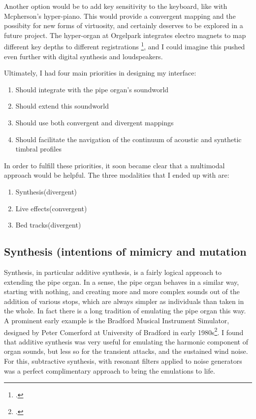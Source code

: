 \documentclass[12pt,twoside,maitrise]{dms_ks}
\theoremstyle{definition}
\begin{document}
Another option would be to add key sensitivity to the keyboard, like with Mcpherson's hyper-piano. This would provide a convergent mapping and the possibity for new forms of virtuosity, and certainly deserves to be explored in a future project. The hyper-organ at Orgelpark integrates electro magnets to map different key depths to different registrations \footcite[14]{van_heumen_new_2014}, and I could imagine this pushed even further with digital synthesis and loudspeakers. 

Ultimately, I had four main priorities in designing my interface:

\begin{enumerate}
  \item Should integrate with the pipe organ's soundworld

  \item Should extend this soundworld
   
  \item Should use both convergent and divergent mappings

  \item Should facilitate the navigation of the continuum of acoustic
and synthetic timbral profiles
\end{enumerate}

In order to fulfill these priorities, it soon became clear that a multimodal approach would be helpful. The three modalities that I ended up with are:

\begin{enumerate}
  \item Synthesis(divergent)
  
  \item Live effects(convergent)
  
  \item Bed tracks(divergent)
\end{enumerate}

\subsection{Synthesis (intentions of mimicry and mutation}

Synthesis, in particular additive synthesis, is a fairly logical approach to extending the pipe organ. 
In a sense, the pipe organ behaves in a similar way, starting with nothing, and creating more and more complex sounds out of the addition of various stops, which are always simpler as individuals than taken in the whole. 
In fact there is a long tradition of emulating the pipe organ this way. 
A prominent early example is the Bradford Musical Instrument Simulator, designed by Peter Comerford at University of Bradford in early 1980s\footcite[61]{comerford_simulating_1993}. 
I found that additive synthesis was very useful for emulating the harmonic component of organ sounds, but less so for the transient attacks, and the sustained wind noise. 
For this, subtractive synthesis, with resonant filters applied to noise generators was a perfect complimentary approach to bring the emulations to life.
\end{document}
